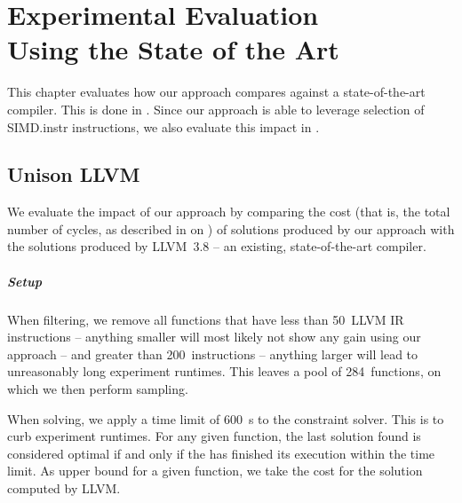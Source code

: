 %

\chapter[Experimental Evaluation Using the State of the Art]%
        {Experimental Evaluation\\ Using the State of the Art}

This chapter evaluates how our approach compares against a state-of-the-art
\gls{compiler}.
%
This is done in .
%
Since our approach is able to leverage selection of \gls{SIMD.instr}
\glspl{instruction}, we also evaluate this impact in
.


\section{Unison \versus LLVM}

We evaluate the impact of our approach by comparing the cost (that is, the total
number of cycles, as described in  on
) of \glspl{solution} produced by our
approach with the \glspl{solution} produced by \mbox{\gls{LLVM} 3.8} -- an
existing, state-of-the-art \gls{compiler}.


\paragraph{Setup}

When filtering, we remove all \glspl{function} that have less than
\num{50}~\gls{LLVM} \gls{IR} \glspl{instruction} -- anything smaller will most
likely not show any gain using our approach -- and greater than
\num{200}~\glspl{instruction} -- anything larger will lead to unreasonably long
experiment runtimes.
%
This leaves a pool of \num{284}~\glspl{function}, on which we then perform
sampling.

When solving, we apply a time limit of \SI{600}{\s} to the \gls{constraint
  solver}.
%
This is to curb experiment runtimes.
%
For any given \gls{function}, the last \gls{solution} found is considered
optimal if and only if the  has finished its
execution within the time limit.
%
As upper bound for a given \gls{function}, we take the cost for the
\gls{solution} computed by \gls{LLVM}.


